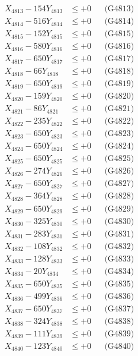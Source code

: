 \documentclass[a4paper,10pt]{article}
\begin{document}
{\begin{align}
X_{4813} - 154Y_{4813} &\leq +0 && \text{(G4813)} \\
X_{4814} - 516Y_{4814} &\leq +0 && \text{(G4814)} \\
X_{4815} - 152Y_{4815} &\leq +0 && \text{(G4815)} \\
X_{4816} - 580Y_{4816} &\leq +0 && \text{(G4816)} \\
X_{4817} - 650Y_{4817} &\leq +0 && \text{(G4817)} \\
X_{4818} - 66Y_{4818} &\leq +0 && \text{(G4818)} \\
X_{4819} - 650Y_{4819} &\leq +0 && \text{(G4819)} \\
X_{4820} - 159Y_{4820} &\leq +0 && \text{(G4820)} \\
\allowbreak
X_{4821} - 86Y_{4821} &\leq +0 && \text{(G4821)} \\
X_{4822} - 235Y_{4822} &\leq +0 && \text{(G4822)} \\
X_{4823} - 650Y_{4823} &\leq +0 && \text{(G4823)} \\
X_{4824} - 650Y_{4824} &\leq +0 && \text{(G4824)} \\
X_{4825} - 650Y_{4825} &\leq +0 && \text{(G4825)} \\
X_{4826} - 274Y_{4826} &\leq +0 && \text{(G4826)} \\
X_{4827} - 650Y_{4827} &\leq +0 && \text{(G4827)} \\
X_{4828} - 364Y_{4828} &\leq +0 && \text{(G4828)} \\
X_{4829} - 650Y_{4829} &\leq +0 && \text{(G4829)} \\
X_{4830} - 325Y_{4830} &\leq +0 && \text{(G4830)} \\
\allowbreak
X_{4831} - 283Y_{4831} &\leq +0 && \text{(G4831)} \\
X_{4832} - 108Y_{4832} &\leq +0 && \text{(G4832)} \\
X_{4833} - 128Y_{4833} &\leq +0 && \text{(G4833)} \\
X_{4834} - 20Y_{4834} &\leq +0 && \text{(G4834)} \\
X_{4835} - 650Y_{4835} &\leq +0 && \text{(G4835)} \\
X_{4836} - 499Y_{4836} &\leq +0 && \text{(G4836)} \\
X_{4837} - 650Y_{4837} &\leq +0 && \text{(G4837)} \\
X_{4838} - 324Y_{4838} &\leq +0 && \text{(G4838)} \\
X_{4839} - 111Y_{4839} &\leq +0 && \text{(G4839)} \\
X_{4840} - 123Y_{4840} &\leq +0 && \text{(G4840)} \\

\end{align}}
\end{document}
